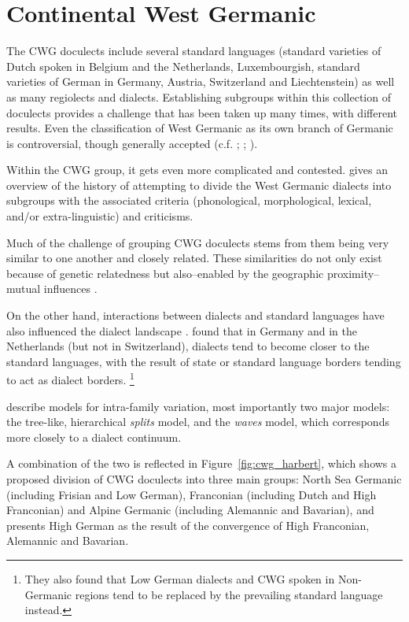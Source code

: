 \documentclass[a4paper]{article}
\begin{document}
\section{Continental West Germanic}
\label{sec:cwg}

The CWG doculects include several standard languages
(standard varieties of Dutch spoken in Belgium and the Netherlands,
Luxembourgish, standard varieties of German in
Germany, Austria, Switzerland and Liechtenstein)
as well as many regiolects and dialects.
Establishing subgroups within this collection of doculects provides a challenge
that has been taken up many times, with different results.
Even the classification of West Germanic
as its own branch of Germanic is controversial,
though generally accepted
(c.f. \citet{voyles1971problem}; \citet[pp. 7-8]{harbert2007germanic}; \citet{ringe2012cladistic}).

Within the CWG group, it gets even more complicated and contested.
\citet[pp. 72-80]{nielsen1989germanic} gives an overview of the history of attempting to divide the West Germanic dialects into subgroups with the associated criteria (phonological, morphological, lexical, and/or extra-linguistic) and criticisms.

Much of the challenge of grouping CWG doculects stems from
them being very similar to one another and closely related.
These similarities do not only exist because of genetic relatedness
but also--enabled by the geographic proximity--mutual influences
\citep[p. 8]{harbert2007germanic}.

On the other hand, 
interactions between dialects and standard languages
have also influenced the dialect landscape
\citep{coetsem1992interaction}.
\citet{kremer1990einfuehrung} found that in Germany and in the Netherlands
(but not in Switzerland), dialects tend to become closer to the standard languages,
with the result of state or standard language borders tending to act as dialect borders.
\footnote{
They also found that Low German dialects and CWG spoken in
Non-Germanic regions tend to be replaced by the prevailing standard language instead.}

\citet{heggarty2010splits} describe models for intra-family variation,
most importantly two major models:
the tree-like, hierarchical \textit{splits} model,
and the \textit{waves} model, which corresponds more closely to a dialect continuum.

A combination of the two is reflected in Figure~\ref{fig:cwg_harbert},
which shows a proposed division of CWG doculects
into three main groups: North Sea Germanic (including Frisian and Low German),
Franconian (including Dutch and High Franconian)
and Alpine Germanic (including Alemannic and Bavarian),
and presents High German as the result of the convergence
of High Franconian, Alemannic and Bavarian.
\end{document}
